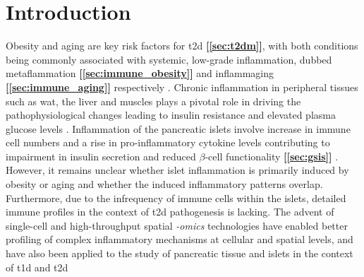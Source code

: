 


\section{Introduction}
\label{sec:chp2_intro}

Obesity and aging are key risk factors for \acrfull{t2d} \textbf{[\autoref{sec:t2dm}]}, with both conditions being commonly associated with systemic, low-grade inflammation, dubbed metaflammation \textbf{[\autoref{sec:immune_obesity}]} and inflammaging \textbf{[\autoref{sec:immune_aging}]} respectively \textbf{\cite{schulze_dietary_2005,donath_inflammation_2013,prattichizzo_inflammageing_2018,lee_integrated_2018,ying_role_2019}}. Chronic inflammation in peripheral tissues such as \acrfull{wat}, the liver and muscles plays a pivotal role in driving the pathophysiological changes leading to insulin resistance and elevated plasma glucose levels \textbf{\cite{gregor_inflammatory_2011,hotamisligil_inflammation_2017}}. Inflammation of the pancreatic islets involve increase in immune cell numbers and a rise in pro-inflammatory cytokine levels contributing to impairment in insulin secretion and reduced $\beta$-cell functionality \textbf{[\autoref{sec:gsis}]} \textbf{\cite{ehses_increased_2007,boni-schnetzler_increased_2008,boni-schnetzler_islet_2019}}. However, it remains unclear whether islet inflammation is primarily induced by obesity or aging and whether the induced inflammatory patterns overlap. Furthermore, due to the infrequency of immune cells within the islets, detailed immune profiles in the context of \gls{t2d} pathogenesis is lacking. The advent of single-cell and high-throughput spatial \textit{-omics} technologies have enabled better profiling of complex inflammatory mechanisms at cellular and spatial levels, and have also been applied to the study of pancreatic tissue and islets in the context of \gls{t1d} \textbf{\cite{ damond_map_2019, wang_multiplexed_2019,chiou_interpreting_2021}} and \gls{t2d} \textbf{\cite{wang_integrating_2023,weng_single_2023}}\\

